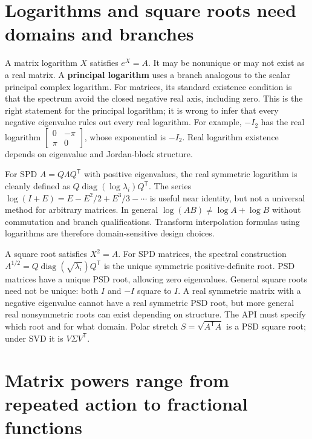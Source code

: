 \section{Logarithms and square roots need domains and branches}\label{02-foundations-ii-ch026-logarithms-and-square-roots-need-domains-and-branches}

\hypertarget{02-foundations-ii-ch026-logarithms-and-square-roots-need-domains-and-branches}{}

A matrix logarithm \(X\) satisfies \(e^X=A\). It may be nonunique or may not exist as a real matrix. A \textbf{principal logarithm} uses a branch analogous to the scalar principal complex logarithm. For matrices, its standard existence condition is that the spectrum avoid the closed negative real axis, including zero. This is the right statement for the principal logarithm; it is wrong to infer that every negative eigenvalue rules out every real logarithm. For example, \(-I_2\) has the real logarithm \(\begin{bmatrix}0&-\pi\\\pi&0\end{bmatrix}\), whose exponential is \(-I_2\). Real logarithm existence depends on eigenvalue and Jordan-block structure.

For SPD \(A=Q\Lambda Q^\mathsf T\) with positive eigenvalues, the real symmetric logarithm is cleanly defined as \(Q\operatorname{diag}(\log\lambda_i)Q^\mathsf T\). The series \(\log(I+E)=E-E^2/2+E^3/3-\cdots\) is useful near identity, but not a universal method for arbitrary matrices. In general \(\log(AB)\ne\log A+\log B\) without commutation and branch qualifications. Transform interpolation formulas using logarithms are therefore domain-sensitive design choices.

A square root satisfies \(X^2=A\). For SPD matrices, the spectral construction \(A^{1/2}=Q\operatorname{diag}(\sqrt{\lambda_i})Q^\mathsf T\) is the unique symmetric positive-definite root. PSD matrices have a unique PSD root, allowing zero eigenvalues. General square roots need not be unique: both \(I\) and \(-I\) square to \(I\). A real symmetric matrix with a negative eigenvalue cannot have a real symmetric PSD root, but more general real nonsymmetric roots can exist depending on structure. The API must specify which root and for what domain. Polar stretch \(S=\sqrt{A^\mathsf TA}\) is a PSD square root; under SVD it is \(V\Sigma V^\mathsf T\).

\section{Matrix powers range from repeated action to fractional functions}\label{02-foundations-ii-ch026-matrix-powers-range-from-repeated-action-to-fractional-functions}

